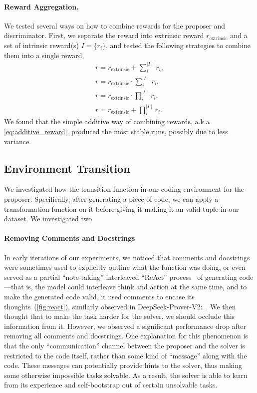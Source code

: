\documentclass{article}
\begin{document}
\paragraph{Reward Aggregation.} We tested several ways on how to combine rewards for the proposer and discriminator. First, we separate the reward into extrinsic reward \(r_\text{extrinsic}\) and a set of intrinsic reward(s) \(I = \{r_i\}\), and tested the following strategies to combine them into a single reward,
\begin{align}
\label{eq:additive_reward}
    r = r_\text{extrinsic} + \sum^{\mid I \mid}_i r_{i}, \\
    r = r_\text{extrinsic} \cdot \sum^{\mid I \mid}_i r_{i}, \\
    r = r_\text{extrinsic} \cdot \prod^{\mid I \mid}_i r_{i}, \\
    r = r_\text{extrinsic} + \prod^{\mid I \mid}_i r_{i}.
\end{align}
We found that the simple additive way of combining rewards, a.k.a \cref{eq:additive_reward}, produced the most stable runs, possibly due to less variance.

\subsection{Environment Transition}
We investigated how the transition function in our coding environment for the proposer. Specifically, after generating a piece of code, we can apply a transformation function on it before giving it making it an valid tuple in our dataset. We investigated two 
\paragraph{Removing Comments and Docstrings} In early iterations of our experiments, we noticed that comments and docstrings were sometimes used to explicitly outline what the function was doing, or even served as a partial “note-taking” interleaved “ReAct” process~\citep{yao2023react} of generating code—that is, the model could interleave think and action at the same time, and to make the generated code valid, it used comments to encase its thoughts~(\cref{fig:react}), similarly observed in DeepSeek-Prover-V2:~\citep{ren2025deepseekproverv2advancingformalmathematical}. We then thought that to make the task harder for the solver, we should occlude this information from it. However, we observed a significant performance drop after removing all comments and docstrings. One explanation for this phenomenon is that the only “communication” channel between the proposer and the solver is restricted to the code itself, rather than some kind of “message” along with the code. These messages can potentially provide hints to the solver, thus making some otherwise impossible tasks solvable. As a result, the solver is able to learn from its experience and self-bootstrap out of certain unsolvable tasks.
\end{document}
